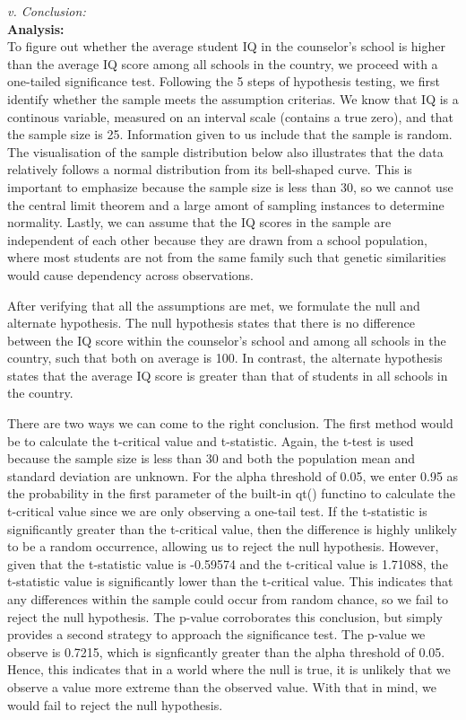 \documentclass[12pt,letterpaper]{article}
\begin{document}
\begin{enumerate}
		\textit{v. Conclusion:}\\
		\textbf{Analysis:}\\
		To figure out whether the average student IQ in the counselor's school is higher than the average IQ score among all schools in the country, we proceed with a one-tailed significance test. Following the 5 steps of hypothesis testing, we first identify whether the sample meets the assumption criterias. We know that IQ is a continous variable, measured on an interval scale (contains a true zero), and that the sample size is 25. Information given to us include that the sample is random. The visualisation of the sample distribution below also illustrates that the data relatively follows a normal distribution from its bell-shaped curve. This is important to emphasize because the sample size is less than 30, so we cannot use the central limit theorem and a large amont of sampling instances to determine normality. Lastly, we can assume that the IQ scores in the sample are independent of each other because they are drawn from a school population, where most students are not from the same family such that genetic similarities would cause dependency across observations. 
		
		After verifying that all the assumptions are met, we formulate the null and alternate hypothesis. The null hypothesis states that there is no difference between the IQ score within the counselor's school and among all schools in the country, such that both on average is 100. In contrast, the alternate hypothesis states that the average IQ score is greater than that of students in all schools in the country. 
		
		There are two ways we can come to the right conclusion. The first method would be to calculate the t-critical value and t-statistic. Again, the t-test is used because the sample size is less than 30 and both the population mean and standard deviation are unknown. For the alpha threshold of 0.05, we enter 0.95 as the probability in the first parameter of the built-in qt() functino to calculate the t-critical value since we are only observing a one-tail test. If the t-statistic is significantly greater than the t-critical value, then the difference is highly unlikely to be a random occurrence, allowing us to reject the null hypothesis. However, given that the t-statistic value is -0.59574 and the t-critical value is 1.71088, the t-statistic value is significantly lower than the t-critical value. This indicates that any differences within the sample could occur from random chance, so we fail to reject the null hypothesis. The p-value corroborates this conclusion, but simply provides a second strategy to approach the significance test. The p-value we observe is 0.7215, which is signficantly greater than the alpha threshold of 0.05. Hence, this indicates that in a world where the null is true, it is unlikely that we observe a value more extreme than the observed value. With that in mind, we would fail to reject the null hypothesis.
		

\end{enumerate}
\end{document}
